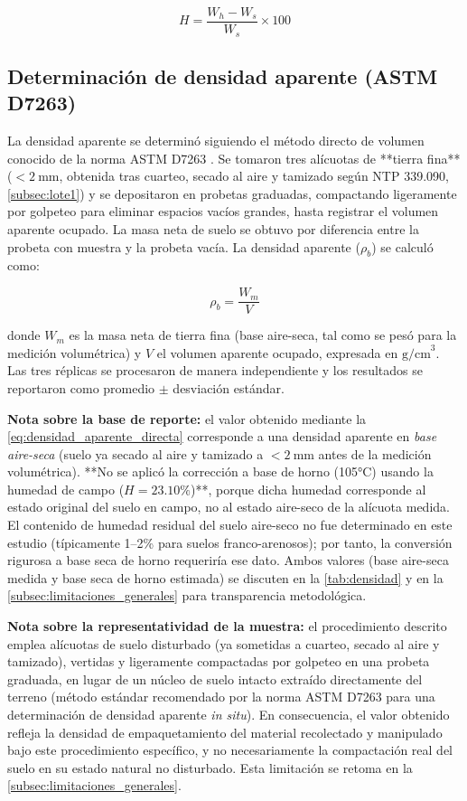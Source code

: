 \documentclass[fleqn]{jaes}
\begin{document}
\begin{equation}
H = \frac{W_h - W_s}{W_s} \times 100
\label{eq:humedad}
\end{equation}

\subsection{Determinación de densidad aparente (ASTM D7263)}

La densidad aparente se determinó siguiendo el método directo de volumen conocido de la norma ASTM D7263 \cite{ASTMInternational2009}. Se tomaron tres alícuotas de **tierra fina** ($<2~\text{mm}$, obtenida tras cuarteo, secado al aire y tamizado según NTP 339.090, \cref{subsec:lote1}) y se depositaron en probetas graduadas, compactando ligeramente por golpeteo para eliminar espacios vacíos grandes, hasta registrar el volumen aparente ocupado. La masa neta de suelo se obtuvo por diferencia entre la probeta con muestra y la probeta vacía. La densidad aparente ($\rho_b$) se calculó como:

\begin{equation}
\rho_b = \frac{W_m}{V}
\label{eq:densidad_aparente_directa}
\end{equation}

donde $W_m$ es la masa neta de tierra fina (base aire-seca, tal como se pesó para la medición volumétrica) y $V$ el volumen aparente ocupado, expresada en $\text{g/cm}^3$. Las tres réplicas se procesaron de manera independiente y los resultados se reportaron como promedio $\pm$ desviación estándar.

\textbf{Nota sobre la base de reporte:} el valor obtenido mediante la \cref{eq:densidad_aparente_directa} corresponde a una densidad aparente en \textit{base aire-seca} (suelo ya secado al aire y tamizado a $<2~\text{mm}$ antes de la medición volumétrica). **No se aplicó la corrección a base de horno (105°C) usando la humedad de campo ($H=23.10\%$)**, porque dicha humedad corresponde al estado original del suelo en campo, no al estado aire-seco de la alícuota medida. El contenido de humedad residual del suelo aire-seco no fue determinado en este estudio (típicamente 1--2\% para suelos franco-arenosos); por tanto, la conversión rigurosa a base seca de horno requeriría ese dato. Ambos valores (base aire-seca medida y base seca de horno estimada) se discuten en la \cref{tab:densidad} y en la \cref{subsec:limitaciones_generales} para transparencia metodológica.

\textbf{Nota sobre la representatividad de la muestra:} el procedimiento descrito emplea alícuotas de suelo disturbado (ya sometidas a cuarteo, secado al aire y tamizado), vertidas y ligeramente compactadas por golpeteo en una probeta graduada, en lugar de un núcleo de suelo intacto extraído directamente del terreno (método estándar recomendado por la norma ASTM D7263 para una determinación de densidad aparente \textit{in situ}). En consecuencia, el valor obtenido refleja la densidad de empaquetamiento del material recolectado y manipulado bajo este procedimiento específico, y no necesariamente la compactación real del suelo en su estado natural no disturbado. Esta limitación se retoma en la \cref{subsec:limitaciones_generales}.
\end{document}
